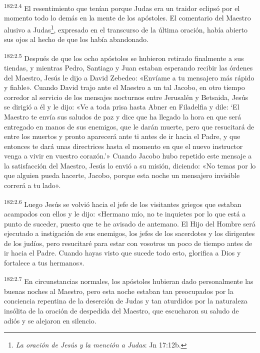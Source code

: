 \par
\textsuperscript{182:2.4} El resentimiento que tenían porque Judas era un traidor eclipsó por el momento todo lo demás en la mente de los apóstoles. El comentario del Maestro alusivo a Judas\footnote{\textit{La oración de Jesús y la mención a Judas}: Jn 17:12b.}, expresado en el transcurso de la última oración, había abierto sus ojos al hecho de que los había abandonado.

\par
\textsuperscript{182:2.5} Después de que los ocho apóstoles se hubieron retirado finalmente a sus tiendas, y mientras Pedro, Santiago y Juan estaban esperando recibir las órdenes del Maestro, Jesús le dijo a David Zebedeo: «Envíame a tu mensajero más rápido y fiable». Cuando David trajo ante el Maestro a un tal Jacobo, en otro tiempo corredor al servicio de los mensajes nocturnos entre Jerusalén y Betsaida, Jesús se dirigió a él y le dijo: «Ve a toda prisa hasta Abner en Filadelfia y dile: `El Maestro te envía sus saludos de paz y dice que ha llegado la hora en que será entregado en manos de sus enemigos, que le darán muerte, pero que resucitará de entre los muertos y pronto aparecerá ante ti antes de ir hacia el Padre, y que entonces te dará unas directrices hasta el momento en que el nuevo instructor venga a vivir en vuestro corazón.'» Cuando Jacobo hubo repetido este mensaje a la satisfacción del Maestro, Jesús lo envió a su misión, diciendo: «No temas por lo que alguien pueda hacerte, Jacobo, porque esta noche un mensajero invisible correrá a tu lado».

\par
\textsuperscript{182:2.6} Luego Jesús se volvió hacia el jefe de los visitantes griegos que estaban acampados con ellos y le dijo: «Hermano mío, no te inquietes por lo que está a punto de suceder, puesto que te he avisado de antemano. El Hijo del Hombre será ejecutado a instigación de sus enemigos, los jefes de los sacerdotes y los dirigentes de los judíos, pero resucitaré para estar con vosotros un poco de tiempo antes de ir hacia el Padre. Cuando hayas visto que sucede todo esto, glorifica a Dios y fortalece a tus hermanos».

\par
\textsuperscript{182:2.7} En circunstancias normales, los apóstoles hubieran dado personalmente las buenas noches al Maestro, pero esta noche estaban tan preocupados por la conciencia repentina de la deserción de Judas y tan aturdidos por la naturaleza insólita de la oración de despedida del Maestro, que escucharon su saludo de adiós y se alejaron en silencio.

